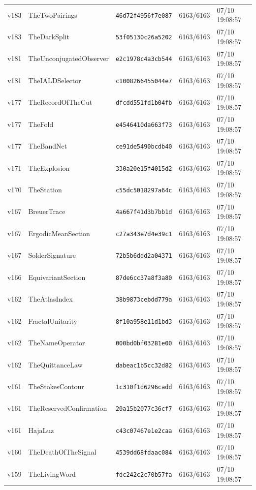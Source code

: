 \documentclass[11pt]{article}
\theoremstyle{definition}\newtheorem{deriv}{Derivation}
\begin{document}
{\begin{longtable}{@{}lllll@{}}
v183 & TheTwoPairings & \texttt{46d72f4956f7e087} & 6163/6163 & 07/10 19:08:57 \\
v183 & TheDarkSplit & \texttt{53f05130c26a5202} & 6163/6163 & 07/10 19:08:57 \\
v181 & TheUnconjugatedObserver & \texttt{e2c1978c4a3cb544} & 6163/6163 & 07/10 19:08:57 \\
v181 & TheIALDSelector & \texttt{c1008266455044e7} & 6163/6163 & 07/10 19:08:57 \\
v177 & TheRecordOfTheCut & \texttt{dfcdd551fd1b04fb} & 6163/6163 & 07/10 19:08:57 \\
v177 & TheFold & \texttt{e4546410da663f73} & 6163/6163 & 07/10 19:08:57 \\
v177 & TheBandNet & \texttt{ce91de5490bcdb40} & 6163/6163 & 07/10 19:08:57 \\
v171 & TheExplosion & \texttt{330a20e15f4015d2} & 6163/6163 & 07/10 19:08:57 \\
v170 & TheStation & \texttt{c55dc5018297a64c} & 6163/6163 & 07/10 19:08:57 \\
v167 & BreuerTrace & \texttt{4a667f41d3b7bb1d} & 6163/6163 & 07/10 19:08:57 \\
v167 & ErgodicMeanSection & \texttt{c27a343e7d4e39c1} & 6163/6163 & 07/10 19:08:57 \\
v167 & SolderSignature & \texttt{72b5b6ddd2a04371} & 6163/6163 & 07/10 19:08:57 \\
v166 & EquivariantSection & \texttt{87de6cc37a8f3a80} & 6163/6163 & 07/10 19:08:57 \\
v162 & TheAtlasIndex & \texttt{38b9873cebdd779a} & 6163/6163 & 07/10 19:08:57 \\
v162 & FractalUnitarity & \texttt{8f10a958e11d1bd3} & 6163/6163 & 07/10 19:08:57 \\
v162 & TheNameOperator & \texttt{000bd0bf03281e00} & 6163/6163 & 07/10 19:08:57 \\
v162 & TheQuittanceLaw & \texttt{dabeac1b5cc32d82} & 6163/6163 & 07/10 19:08:57 \\
v161 & TheStokesContour & \texttt{1c310f1d6296cadd} & 6163/6163 & 07/10 19:08:57 \\
v161 & TheReservedConfirmation & \texttt{20a15b2077c36cf7} & 6163/6163 & 07/10 19:08:57 \\
v161 & HajaLuz & \texttt{c43c07467e1e2caa} & 6163/6163 & 07/10 19:08:57 \\
v160 & TheDeathOfTheSignal & \texttt{4539dd68fdaac084} & 6163/6163 & 07/10 19:08:57 \\
v159 & TheLivingWord & \texttt{fdc242c2c70b57fa} & 6163/6163 & 07/10 19:08:57 \\

\end{longtable}}
\end{document}
